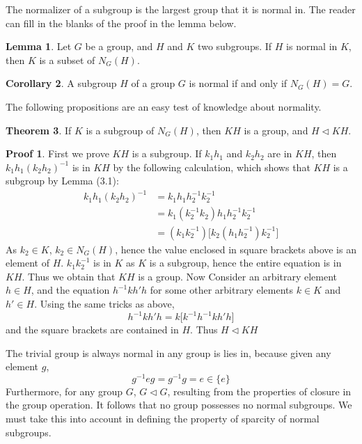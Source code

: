 \documentclass[12pt]{amsbook}
\theoremstyle{definition}
\newtheorem{theorem}{Theorem}[chapter]
\newtheorem{lemma}[theorem]{Lemma}
\newtheorem{corollary}[theorem]{Corollary}
\newtheorem*{prf}{Proof}
\begin{document}
The normalizer of a subgroup is the largest group that it is normal in. The reader can fill in the blanks of the proof in the lemma below.

\begin{lemma}
    Let $G$ be a group, and $H$ and $K$ two subgroups. If $H$ is normal in $K$, then $K$ is a subset of $N_G(H)$.
\end{lemma}

\begin{corollary}
    A subgroup $H$ of a group $G$ is normal if and only if $N_G(H) = G$.
\end{corollary}

The following propositions are an easy test of knowledge about normality.

\begin{theorem}
    If $K$ is a subgroup of $N_G(H)$, then $KH$ is a group, and $H \lhd KH$.
\end{theorem}
\begin{prf}
    First we prove $KH$ is a subgroup. If $k_1h_1$ and $k_2h_2$ are in $KH$, then $k_1h_1(k_2h_2)^{-1}$ is in $KH$ by the following calculation, which shows that $KH$ is a subgroup by Lemma (3.1):
    \begin{align*}
    k_1h_1(k_2h_2)^{-1} &= k_1h_1h_2^{-1}k_2^{-1}\\
                        &= k_1(k_2^{-1}k_2)h_1h_2^{-1}k_2^{-1}\\
                        &= (k_1k_2^{-1})\big[ k_2(h_1h_2^{-1})k_2^{-1} \big]
    \end{align*}
    As $k_2 \in K$, $k_2 \in N_G(H)$, hence the value enclosed in square brackets above is an element of $H$. $k_1k_2^{-1}$ is in $K$ as $K$ is a subgroup, hence the entire equation is in $KH$. Thus we obtain that $KH$ is a group. Now Consider an arbitrary element $h \in H$, and the equation $h^{-1}kh'h$ for some other arbitrary elements $k \in K$ and $h' \in H$. Using the same tricks as above,
    \[ h^{-1}kh'h = k \big[ k^{-1}h^{-1}kh'h \big] \]
    and the square brackets are contained in $H$. Thus $H \lhd KH$
\end{prf}

The trivial group is always normal in any group is lies in, because given any element $g$,
%
\[ g^{-1}eg = g^{-1}g = e \in \{e\} \]
%
Furthermore, for any group $G$, $G \lhd G$, resulting from the properties of closure in the group operation. It follows that no group possesses no normal subgroups. We must take this into account in defining the property of sparcity of normal subgroups.
\end{document}
